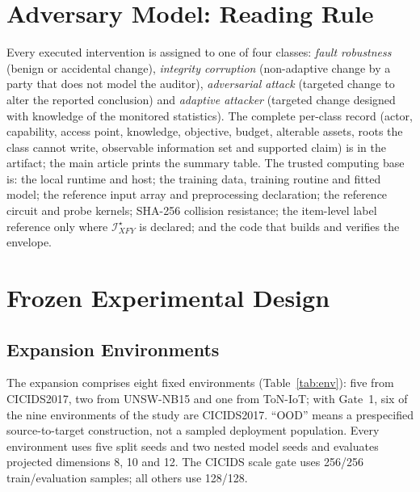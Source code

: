 \documentclass[10pt,journal,compsoc]{IEEEtran}
\newcommand{\IXFYs}{\mathcal I_{XFY}^{\star}}
\begin{document}


\section{Adversary Model: Reading Rule}

Every executed intervention is assigned to one of four classes: \emph{fault
robustness} (benign or accidental change), \emph{integrity corruption}
(non-adaptive change by a party that does not model the auditor),
\emph{adversarial attack} (targeted change to alter the reported conclusion)
and \emph{adaptive attacker} (targeted change designed with knowledge of the
monitored statistics). The complete per-class record (actor, capability,
access point, knowledge, objective, budget, alterable assets, roots the class
cannot write, observable information set and supported claim) is
 in the artifact; the main article prints
the summary table. The trusted computing base is: the local runtime and host;
the training data, training routine and fitted model; the reference input
array and preprocessing declaration; the reference circuit and probe kernels;
SHA-256 collision resistance; the item-level label reference only where
$\IXFYs$ is declared; and the code that builds and verifies the envelope.

\section{Frozen Experimental Design}

\subsection{Expansion Environments}

The expansion comprises eight fixed environments (Table~\ref{tab:env}): five
from CICIDS2017, two from UNSW-NB15 and one from ToN-IoT; with Gate~1, six of
the nine environments of the study are CICIDS2017. ``OOD'' means a
prespecified source-to-target construction, not a sampled deployment
population. Every environment uses five split seeds and two nested model
seeds and evaluates projected dimensions 8, 10 and 12. The CICIDS scale gate
uses 256/256 train/evaluation samples; all others use 128/128.
\end{document}
